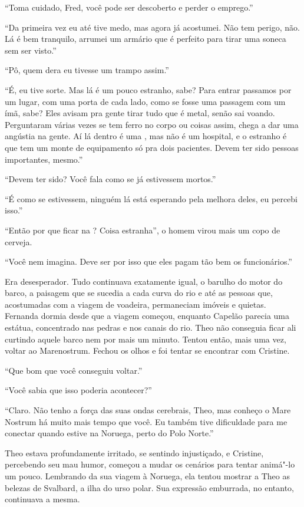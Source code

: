 ``Toma cuidado, Fred, você pode ser descoberto e perder o emprego.''

``Da primeira vez eu até tive medo, mas agora já acostumei. Não tem
perigo, não. Lá é bem tranquilo, arrumei um armário que é perfeito para
tirar uma soneca sem ser visto.''

``Pô, quem dera eu tivesse um trampo assim.''

``É, eu tive sorte. Mas lá é um pouco estranho, sabe? Para entrar
passamos por um lugar, com uma porta de cada lado, como se fosse uma
passagem com um ímã, sabe? Eles avisam pra gente tirar tudo que é metal,
senão sai voando. Perguntaram várias vezes se tem ferro no corpo ou
coisas assim, chega a dar uma angústia na gente. Aí lá dentro é uma ,
mas não é um hospital, e o estranho é que tem um monte de equipamento só
pra dois pacientes. Devem ter sido pessoas importantes, mesmo.''

``Devem ter sido? Você fala como se já estivessem mortos.''

``É como se estivessem, ninguém lá está esperando pela melhora deles, eu
percebi isso.''

``Então por que ficar na ? Coisa estranha'', o homem virou mais um
copo de cerveja.

``Você nem imagina. Deve ser por isso que eles pagam tão bem os
funcionários.''

\asterisc

Era desesperador. Tudo continuava exatamente igual, o barulho do motor
do barco, a paisagem que se sucedia a cada curva do rio e até as pessoas
que, acostumadas com a viagem de voadeira, permaneciam imóveis e
quietas. Fernanda dormia desde que a viagem começou, enquanto Capelão
parecia uma estátua, concentrado nas pedras e nos canais do rio. Theo
não conseguia ficar ali curtindo aquele barco nem por mais um minuto.
Tentou então, mais uma vez, voltar ao Marenostrum. Fechou os olhos e foi
tentar se encontrar com Cristine.

``Que bom que você conseguiu voltar.''

``Você sabia que isso poderia acontecer?''

``Claro. Não tenho a força das suas ondas cerebrais, Theo, mas conheço o
Mare Nostrum há muito mais tempo que você. Eu também tive dificuldade
para me conectar quando estive na Noruega, perto do Polo Norte.''

Theo estava profundamente irritado, se sentindo injustiçado, e Cristine,
percebendo seu mau humor, começou a mudar os cenários para tentar
animá"-lo um pouco. Lembrando da sua viagem à Noruega, ela tentou mostrar
a Theo as belezas de Svalbard, a ilha do urso polar. Sua expressão
emburrada, no entanto, continuava a mesma.

